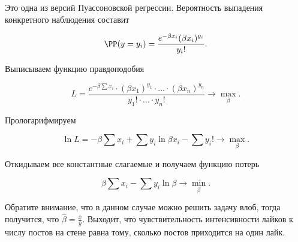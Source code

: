 \documentclass[12pt, a4paper, oneside]{article}
\begin{document}
\begin{sol} 
	Это одна из версий Пуассоновской регрессии. Вероятность выпадения конкретного наблюдения составит
	
	\[ \PP(y = y_i) = \frac{e^{-\beta x_i} (\beta x_i)^{y_i}}{y_i!}.\]
	
	Выписываем функцию правдоподобия
	
	\[ L = \frac{e^{-\beta \sum x_i} \cdot (\beta x_1)^{y_1} \cdot \ldots \cdot (\beta x_n)^{y_n} }{y_1! \cdot \ldots \cdot y_n!} \to \max_{\beta}. \]
	
	Прологарифмируем
	
	\[\ln L = -\beta \sum x_i + \sum y_i \ln \beta x_i - \sum y_i! \to \max_{\beta}.\]
	
	Откидываем все константные слагаемые и получаем функцию потерь
	
	\[\beta \sum x_i -   \sum y_i \ln \beta \to \min_{\beta}. \]
	
	Обратите внимание, что в данном случае можно решить задачу влоб, тогда получится, что $\hat \beta = \frac{\bar x}{\bar y}.$ Выходит, что чувствительность интенсивности лайков к числу постов на стене равна тому, сколько постов приходится на один лайк.
\end{sol} 
\end{document}
